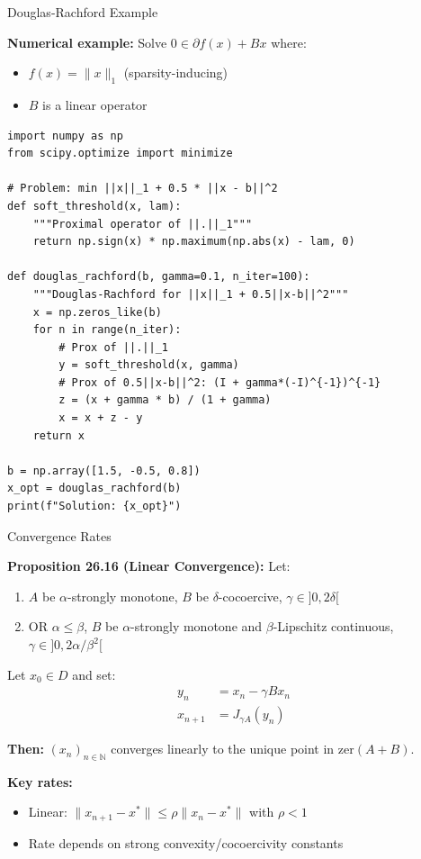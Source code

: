 \documentclass[aspectratio=169,10pt]{beamer}
\begin{document}
\begin{frame}[fragile]{Douglas-Rachford Example}

\textbf{Numerical example:} Solve $0 \in \partial f(x) + Bx$ where:
\begin{itemize}
  \item $f(x) = \|x\|_1$ (sparsity-inducing)
  \item $B$ is a linear operator
\end{itemize}

\vspace{0.2cm}
\lstset{basicstyle=\ttfamily\footnotesize}
\begin{lstlisting}
import numpy as np
from scipy.optimize import minimize

# Problem: min ||x||_1 + 0.5 * ||x - b||^2
def soft_threshold(x, lam):
    """Proximal operator of ||.||_1"""
    return np.sign(x) * np.maximum(np.abs(x) - lam, 0)

def douglas_rachford(b, gamma=0.1, n_iter=100):
    """Douglas-Rachford for ||x||_1 + 0.5||x-b||^2"""
    x = np.zeros_like(b)
    for n in range(n_iter):
        # Prox of ||.||_1
        y = soft_threshold(x, gamma)
        # Prox of 0.5||x-b||^2: (I + gamma*(-I)^{-1})^{-1}
        z = (x + gamma * b) / (1 + gamma)
        x = x + z - y
    return x

b = np.array([1.5, -0.5, 0.8])
x_opt = douglas_rachford(b)
print(f"Solution: {x_opt}")
\end{lstlisting}

\end{frame}

\begin{frame}{Convergence Rates}

\textbf{Proposition 26.16 (Linear Convergence):} Let:
\begin{enumerate}
  \item[(i)] $A$ be $\alpha$-strongly monotone, $B$ be $\delta$-cocoercive, $\gamma \in ]0, 2\delta[$

  \item[(ii)] OR $\alpha \leq \beta$, $B$ be $\alpha$-strongly monotone and $\beta$-Lipschitz continuous, $\gamma \in ]0, 2\alpha/\beta^2[$
\end{enumerate}

Let $x_0 \in D$ and set:
\begin{align*}
  y_n &= x_n - \gamma B x_n \\
  x_{n+1} &= J_{\gamma A}(y_n)
\end{align*}

\textbf{Then:} $(x_n)_{n \in \mathbb{N}}$ converges linearly to the unique point in $\text{zer}(A + B)$.

\vspace{0.3cm}
\textbf{Key rates:}
\begin{itemize}
  \item Linear: $\|x_{n+1} - x^*\| \leq \rho \|x_n - x^*\|$ with $\rho < 1$
  \item Rate depends on strong convexity/cocoercivity constants
\end{itemize}

\end{frame}
\end{document}
